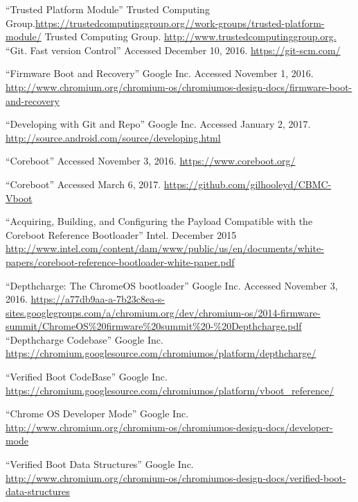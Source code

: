 \documentclass[12pt,lot, lof]{puthesis}
\begin{document}
\begin{flushleft}
\begin{footnotesize}
\begin{thebibliography}{\kern\bibindent}
        ``Trusted Platform Module'' Trusted Computing Group.\url{https://trustedcomputinggroup.org//work-groups/trusted-platform-module/}
        Trusted Computing Group. \url{http://www.trustedcomputinggroup.org.}
        ``Git. Fast version Control'' Accessed December 10, 2016. \url{https://git-scm.com/}

    ``Firmware Boot and Recovery'' Google Inc. Accessed November 1, 2016. \url{http://www.chromium.org/chromium-os/chromiumos-design-docs/firmware-boot-and-recovery}

    ``Developing with Git and Repo'' Google Inc. Accessed January 2, 2017. \url{http://source.android.com/source/developing.html}

    ``Coreboot'' Accessed November 3, 2016. \url{https://www.coreboot.org/}

    ``Coreboot'' Accessed March 6, 2017. \url{https://github.com/gilhooleyd/CBMC-Vboot}

    ``Acquiring, Building, and Configuring the Payload Compatible with the Coreboot Reference Bootloader'' Intel. December 2015 \url{http://www.intel.com/content/dam/www/public/us/en/documents/white-papers/coreboot-reference-bootloader-white-paper.pdf}

    ``Depthcharge: The ChromeOS bootloader'' Google Inc. Accessed November 3, 2016.
    \url{https://a77db9aa-a-7b23c8ea-s-sites.googlegroups.com/a/chromium.org/dev/chromium-os/2014-firmware-summit/ChromeOS\%20firmware\%20summit\%20-\%20Depthcharge.pdf}
    ``Depthcharge Codebase'' Google Inc. \url{https://chromium.googlesource.com/chromiumos/platform/depthcharge/}

    ``Verified Boot CodeBase'' Google Inc. \url{https://chromium.googlesource.com/chromiumos/platform/vboot_reference/}

    ``Chrome OS Developer Mode'' Google Inc. \url{http://www.chromium.org/chromium-os/chromiumos-design-docs/developer-mode}

    ``Verified Boot Data Structures'' Google Inc. \url{http://www.chromium.org/chromium-os/chromiumos-design-docs/verified-boot-data-structures}


\end{thebibliography}
\end{footnotesize}
\end{flushleft}
\end{document}
